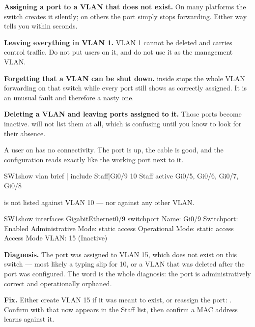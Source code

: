 \begin{pitfall}
\begin{tight}
  \item \textbf{Assigning a port to a VLAN that does not exist.} On many
        platforms the switch creates it silently; on others the port simply stops
        forwarding. Either way  tells you within seconds.
  \item \textbf{Leaving everything in VLAN 1.} VLAN 1 cannot be deleted and
        carries control traffic. Do not put users on it, and do not use it as the
        management VLAN.
  \item \textbf{Forgetting that a VLAN can be shut down.}  inside
         stops the whole VLAN forwarding on that switch while every
        port still shows as correctly assigned. It is an unusual fault and
        therefore a nasty one.
  \item \textbf{Deleting a VLAN and leaving ports assigned to it.} Those ports
        become inactive.  will not list them at all, which is
        confusing until you know to look for their absence.
\end{tight}
\end{pitfall}

\begin{breakfix}
A user on  has no connectivity. The port is up, the cable is good, and
the configuration reads exactly like the working port next to it.

\begin{verify}{SW1}{show vlan brief | include Staff|Gi0/9}
10   Staff                            active    Gi0/5, Gi0/6, Gi0/7, Gi0/8
\end{verify}

 is not listed against VLAN 10 --- nor against any other VLAN.

\begin{verify}{SW1}{show interfaces GigabitEthernet0/9 switchport}
Name: Gi0/9
Switchport: Enabled
Administrative Mode: static access
Operational Mode: static access
Access Mode VLAN: 15 (Inactive)
\end{verify}

\textbf{Diagnosis.} The port was assigned to VLAN 15, which does not exist on this
switch --- most likely a typing slip for 10, or a VLAN that was deleted after the
port was configured. The word  is the whole diagnosis: the port is
administratively correct and operationally orphaned.

\textbf{Fix.} Either create VLAN 15 if it was meant to exist, or reassign the port:
. Confirm with  that
 now appears in the Staff list, then confirm a MAC address learns
against it.
\end{breakfix}

